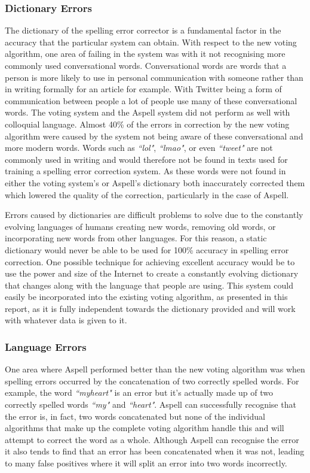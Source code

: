 \subsubsection*{Dictionary Errors}
The dictionary of the spelling error corrector is a fundamental factor in the accuracy that the particular system can obtain. With respect to the new voting algorithm, one area of failing in the system was with it not recognising more commonly used conversational words. Conversational words are words that a person is more likely to use in personal communication with someone rather than in writing formally for an article for example. With Twitter being a form of communication between people a lot of people use many of these conversational words. The voting system and the Aspell system did not perform as well with colloquial language. Almost 40\% of the errors in correction by the new voting algorithm were caused by the system not being aware of these conversational and more modern words. Words such as \emph{``lol"}, \emph{``lmao"}, or even \emph{``tweet"} are not commonly used in writing and would therefore not be found in texts used for training a spelling error correction system. As these words were not found in either the voting system's or Aspell's dictionary both inaccurately corrected them which lowered the quality of the correction, particularly in the case of Aspell.

Errors caused by dictionaries are difficult problems to solve due to the constantly evolving languages of humans creating new words, removing old words, or incorporating new words from other languages. For this reason, a static dictionary would never be able to be used for 100\% accuracy in spelling error correction. One possible technique for achieving excellent accuracy would be to use the power and size of the Internet to create a constantly evolving dictionary that changes along with the language that people are using. This system could easily be incorporated into the existing voting algorithm, as presented in this report, as it is fully independent towards the dictionary provided and will work with whatever data is given to it.

\subsubsection*{Language Errors}
One area where Aspell performed better than the new voting algorithm was when spelling errors occurred by the concatenation of two correctly spelled words. For example, the word \emph{``myheart"} is an error but it's actually made up of two correctly spelled words \emph{``my"} and \emph{``heart"}. Aspell can successfully recognise that the error is, in fact, two words concatenated but none of the individual algorithms that make up the complete voting algorithm handle this and will attempt to correct the word as a whole. Although Aspell can recognise the error it also tends to find that an error has been concatenated when it was not, leading to many false positives where it will split an error into two words incorrectly.

